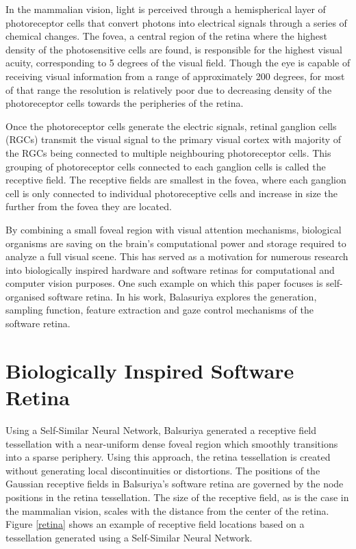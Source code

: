 \documentclass{l4proj}
\begin{document}
In the mammalian vision, light is perceived through a hemispherical layer of photoreceptor cells that convert photons into electrical signals through a series of chemical changes. The fovea, a central region of the retina where the highest density of the photosensitive cells are found, is responsible for the highest visual acuity, corresponding to 5 degrees of the visual field. Though the eye is capable of receiving visual information from a range of approximately 200 degrees, for most of that range the resolution is relatively poor due to decreasing density of the photoreceptor cells towards the peripheries of the retina. 

Once the photoreceptor cells generate the electric signals, retinal ganglion cells (RGCs) transmit the visual signal to the primary visual cortex with majority of the RGCs being connected to multiple neighbouring photoreceptor cells. This grouping of photoreceptor cells connected to each ganglion cells is called the receptive field. The receptive fields are smallest in the fovea, where each ganglion cell is only connected to individual photoreceptive cells and increase in size the further from the fovea they are located. 

By combining a small foveal region with visual attention mechanisms, biological organisms are saving on the brain's computational power and storage required to analyze a full visual scene. This has served as a motivation for numerous research into biologically inspired hardware and software retinas for computational and computer vision purposes. One such example on which this paper focuses is \citet{SumithaBalasuriya} self-organised software retina. In his work, Balasuriya explores the generation, sampling function, feature extraction and gaze control mechanisms of the software retina. 


\section{Biologically Inspired Software Retina}


Using a Self-Similar Neural Network, Balsuriya generated a receptive field tessellation with a near-uniform dense foveal region which smoothly transitions into a sparse periphery. Using this approach, the retina tessellation is created without generating local discontinuities or distortions. The positions of the Gaussian receptive fields in Balsuriya's software retina are governed by the node positions in the retina tessellation. The size of the receptive field, as is the case in the mammalian vision, scales with the distance from the center of the retina. Figure \ref{retina} shows an example of receptive field locations based on a tessellation generated using a Self-Similar Neural Network. 
\end{document}
